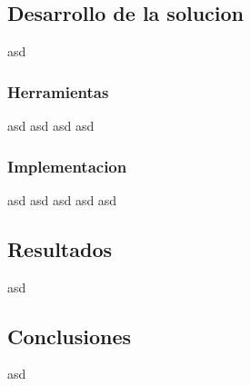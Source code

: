 \documentclass[12pt]{article}
\newcounter{subsubsubsection}[subsubsection]
\begin{document}
\subsection{Desarrollo de la solucion}
asd
\subsubsection{Herramientas}
asd
asd
asd
asd
\subsubsection{Implementacion}
asd
asd
asd
asd
asd

\subsection{Resultados}
asd
\subsection{Conclusiones}
asd
\end{document}
